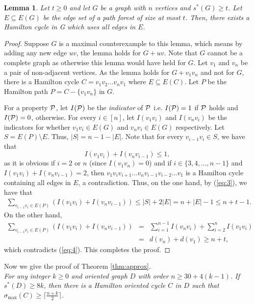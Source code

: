 \documentclass[11pt]{article}
\newtheorem{lemma}[theorem]{Lemma}
\newcommand{\QG}[1]{{#1}}
\newcommand{\2}{\vspace{0.2cm}}
\begin{document}
	\begin{lemma}\label{lem:3}
		Let $t\geq 0$ and let $G$ be a graph with $n$ vertices and $s^*(G)\geq t$. Let $E\subseteq E(G)$ be the edge set of a path forest of size at most $t$. Then, there exists a Hamilton cycle in G which uses all edges in $E$.
	\end{lemma}
	\begin{proof}
  Suppose $G$ is a maximal counterexample to this lemma, which means by adding any new edge $uv$, the lemma holds for $G+uv$. Note that $G$ cannot be a complete graph as otherwise this lemma would have held for $G$. Let $v_1$ and $v_n$ be a pair of non-adjacent vertices. As the lemma holds for $G+v_1v_n$ and not for $G$, there is a Hamilton cycle $C=v_1v_2\dots v_nv_1$ where $E\subseteq E(C)$. Let $P$ be the Hamilton path $P=C-\{v_1v_n\}$ in $G$.

For a property $\cal P$, let $I({\cal P})$ be the {\em indicator} of $\cal P$ i.e.  $I({\cal P})=1$ if  $\cal P$ holds and $I({\cal P})=0$, otherwise. For every $i\in [n]$, let $I(v_1v_i)$ and $I(v_nv_i)$ be the indicators for whether $v_1v_i\in E(G)$ and $v_nv_i\in E(G)$ respectively. Let $S=E(P)\setminus E$. Thus, $|S|=n-1-|E|$. Note that for every $v_{i-1}v_{i}\in S$, we have that
    \begin{equation}\label{eq:3}
    	I(v_1v_{i})+I(v_nv_{i-1})\leq 1,
    \end{equation}
    as it is obvious if $i=2$ or $n$ (since $I(v_1v_n)=0$) and if $i\in \{3, 4, \dots, n-1\}$ and $I(v_1v_{i})+I(v_nv_{i-1})= 2$, then $v_1v_iv_{i+1}\dots v_n v_{i-1} v_{i-2}\dots v_1$ is a Hamilton cycle containing all edges in $E$, a contradiction. Thus, on the one hand, by (\ref{eq:3}), we have that
    \begin{eqnarray}\label{eq:4}
    \sum_{v_{i-1}v_i\in E(P)} (I(v_1v_i)+I(v_nv_{i-1})) \leq |S|+2|E|=n+|E|-1\leq n+t-1.
     \end{eqnarray}
     On the other hand,
      \begin{eqnarray*}
   	\sum_{v_{i-1}v_i\in E(P)} (I(v_1v_i)+I(v_nv_{i-1})) &=&\sum_{i=1}^{n-1} I(v_nv_i) +\sum_{i=2}^{n} I(v_1v_i)\\
&=&d(v_n)+d(v_1)\geq n+t,
\end{eqnarray*}
which contradicts (\ref{eq:4}). This completes the proof.
	\end{proof}
	
	Now we give the proof of Theorem \ref{thm:approx}.\\
	
	\QG{ \textit{For any integer $k\geq 0$ and oriented graph $D$ with order $n\geq 30+4(k-1)$. If $s^*(D)\geq 8k$, then there is a Hamilton oriented cycle $C$ in $D$ such that $\sigma_{\max}(C)\geq \lceil\frac{n+k}{2}\rceil$.}}	
			
\end{document}
